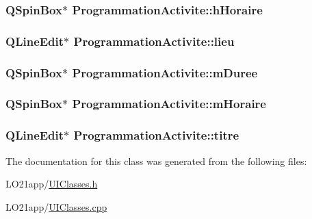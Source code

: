 \subsubsection[{h\+Horaire}]{\setlength{\rightskip}{0pt plus 5cm}Q\+Spin\+Box$\ast$ Programmation\+Activite\+::h\+Horaire}\label{class_programmation_activite_a7edeef86cb3b134a39b3289c11930cfe}
\hypertarget{class_programmation_activite_ad11789d8e5720d094c2b18f0ab79c8fd}{}
\subsubsection[{lieu}]{\setlength{\rightskip}{0pt plus 5cm}Q\+Line\+Edit$\ast$ Programmation\+Activite\+::lieu}\label{class_programmation_activite_ad11789d8e5720d094c2b18f0ab79c8fd}
\hypertarget{class_programmation_activite_af7138f1541605f97e14984c977ad5632}{}
\subsubsection[{m\+Duree}]{\setlength{\rightskip}{0pt plus 5cm}Q\+Spin\+Box$\ast$ Programmation\+Activite\+::m\+Duree}\label{class_programmation_activite_af7138f1541605f97e14984c977ad5632}
\hypertarget{class_programmation_activite_a4f962ff214fd6decf90e97cde1c1b7d5}{}
\subsubsection[{m\+Horaire}]{\setlength{\rightskip}{0pt plus 5cm}Q\+Spin\+Box$\ast$ Programmation\+Activite\+::m\+Horaire}\label{class_programmation_activite_a4f962ff214fd6decf90e97cde1c1b7d5}
\hypertarget{class_programmation_activite_a4abe5a47855bf2955f81f75c48d1e705}{}
\subsubsection[{titre}]{\setlength{\rightskip}{0pt plus 5cm}Q\+Line\+Edit$\ast$ Programmation\+Activite\+::titre}\label{class_programmation_activite_a4abe5a47855bf2955f81f75c48d1e705}


The documentation for this class was generated from the following files\+:\begin{DoxyCompactItemize}
\item 
L\+O21app/\hyperlink{_u_i_classes_8h}{U\+I\+Classes.\+h}\item 
L\+O21app/\hyperlink{_u_i_classes_8cpp}{U\+I\+Classes.\+cpp}\end{DoxyCompactItemize}
